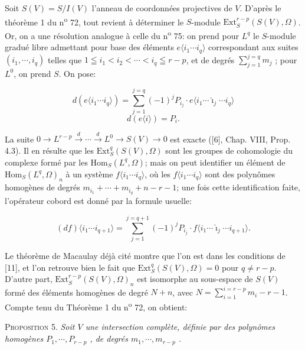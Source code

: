 Soit $S(V) = S/I(V)$ l'anneau de coordonnées projectives de $V$. D'après le théorème 1 du n\textsuperscript{o} 72, tout revient à déterminer le $S$-module $\mathrm{Ext}_S^{r-p}(S(V), \Omega)$. Or, on a une résolution analogue à celle du n\textsuperscript{o} 75: on prend pour $L^q$ le $S$-module gradué libre admettant pour base des éléments $e\langle i_1 \cdots i_q \rangle$ correspondant aux suites $(i_1 , \cdots , i_q)$ telles que $1 \leqq i_1 < i_2 < \cdots < i_q \leqq r - p$, et de degrés $\sum_{j=1}^{j=q} m_j$ ; pour $L^0$, on prend $S$. On pose:

\begin{equation*}
d(e\langle i_1 \cdots i_q \rangle) = \sum_{j=1}^{j=q} (-1)^j P_{i_j} \cdot e\langle i_1 \cdots \hat{\imath}_j \cdots i_q \rangle
\end{equation*}
\begin{equation*}
d(e\langle i \rangle) = P_i .
\end{equation*}

La suite $0 \rightarrow L^{r-p} \overset{d}{\rightarrow} \cdots \overset{d}{\rightarrow} L^0 \rightarrow S(V) \rightarrow 0$ est exacte ([6], Chap. VIII, Prop. 4.3). Il en résulte que les $\mathrm{Ext}_S^q(S(V), \Omega)$ sont les groupes de cohomologie du complexe formé par les $\mathrm{Hom}_S(L^q, \Omega)$; mais on peut identifier un élément de $\mathrm{Hom}_S(L^q, \Omega)_n$ à un système $f\langle i_1 \cdots i_q \rangle$, où les $f\langle i_1 \cdots i_q \rangle$ sont des polynômes homogènes de degrés $m_{i_1} + \cdots + m_{i_q} + n - r - 1$; une fois cette identification faite, l'opérateur cobord est donné par la formule usuelle:

\begin{equation*}
(df)\langle i_1 \cdots i_{q+1} \rangle = \sum_{j=1}^{j=q+1} (-1)^j P_{i_j} \cdot f\langle i_1 \cdots \hat{\imath}_j \cdots i_{q+1} \rangle.
\end{equation*}

Le théorème de Macaulay déjà cité montre que l'on est dans les conditions de [11], et l'on retrouve bien le fait que $\mathrm{Ext}_S^q(S(V), \Omega) = 0$ pour $q \neq r - p$. D'autre part, $\mathrm{Ext}_S^{r-p}(S(V), \Omega)_n$ est isomorphe au sous-espace de $S(V)$ formé des éléments homogènes de degré $N + n$, avec $N = \sum_{i=1}^{i=r-p} m_i - r - 1$. Compte tenu du Théorème 1 du n\textsuperscript{o} 72, on obtient:

\textsc{Proposition} 5. \textit{Soit $V$ une intersection complète, définie par des polynômes homogènes $P_1 , \cdots , P_{r-p}$ , de degrés $m_1 , \cdots , m_{r-p}$ .}
